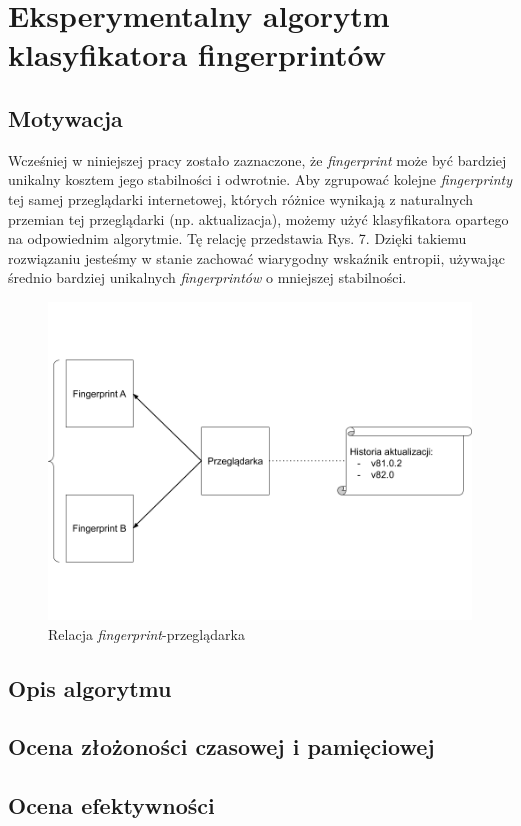 \chapter{Eksperymentalny algorytm klasyfikatora fingerprintów}

\section{Motywacja}
Wcześniej w niniejszej pracy zostało zaznaczone, że \emph{fingerprint} może być
bardziej unikalny kosztem jego stabilności i odwrotnie. Aby zgrupować kolejne
\emph{fingerprinty} tej samej przeglądarki internetowej, których różnice
wynikają z naturalnych przemian tej przeglądarki (np. aktualizacja), możemy użyć
klasyfikatora opartego na odpowiednim algorytmie. Tę relację przedstawia Rys. 7.
Dzięki takiemu rozwiązaniu jesteśmy w stanie zachować wiarygodny wskaźnik
entropii, używając średnio bardziej unikalnych \emph{fingerprintów} o mniejszej
stabilności.

\begin{figure}
	\includegraphics[width=\textwidth,keepaspectratio]{img/09}
	\caption{Relacja \emph{fingerprint}-przeglądarka}
\end{figure}

\section{Opis algorytmu}

\section{Ocena złożoności czasowej i pamięciowej}

\section{Ocena efektywności}
